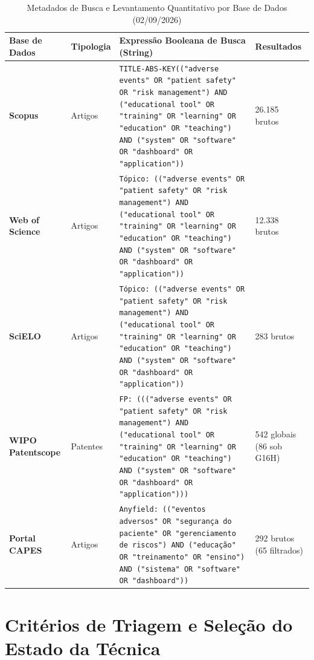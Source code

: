 \begin{table}[!ht]
\centering
\caption[Metadados de Busca e Levantamento Quantitativo por Base de Dados]{Metadados de Busca e Levantamento Quantitativo por Base de Dados (02/09/2026)}
\label{tab_metadados_busca}
\footnotesize
\begin{tabularx}{\textwidth}{p{2.6cm} p{1.8cm} X p{2.2cm}}
\toprule
\textbf{Base de Dados} & \textbf{Tipologia} & \textbf{Expressão Booleana de Busca (String)} & \textbf{Resultados} \\ 
\midrule
\textbf{Scopus} & Artigos & \texttt{TITLE-ABS-KEY(("adverse events" OR "patient safety" OR "risk management") AND ("educational tool" OR "training" OR "learning" OR "education" OR "teaching") AND ("system" OR "software" OR "dashboard" OR "application"))} & 26.185 brutos \\ 
\addlinespace
\textbf{Web of Science} & Artigos & \texttt{Tópico: (("adverse events" OR "patient safety" OR "risk management") AND ("educational tool" OR "training" OR "learning" OR "education" OR "teaching") AND ("system" OR "software" OR "dashboard" OR "application"))} & 12.338 brutos \\ 
\addlinespace
\textbf{SciELO} & Artigos & \texttt{Tópico: (("adverse events" OR "patient safety" OR "risk management") AND ("educational tool" OR "training" OR "learning" OR "education" OR "teaching") AND ("system" OR "software" OR "dashboard" OR "application"))} & 283 brutos \\ 
\addlinespace
\textbf{WIPO Patentscope} & Patentes & \texttt{FP: ((("adverse events" OR "patient safety" OR "risk management") AND ("educational tool" OR "training" OR "learning" OR "education" OR "teaching") AND ("system" OR "software" OR "dashboard" OR "application")))} & 542 globais \newline (86 sob G16H) \\ 
\addlinespace
\textbf{Portal CAPES} & Artigos & \texttt{Anyfield: (("eventos adversos" OR "segurança do paciente" OR "gerenciamento de riscos") AND ("educação" OR "treinamento" OR "ensino") AND ("sistema" OR "software" OR "dashboard"))} & 292 brutos \newline (65 filtrados) \\ 
\bottomrule
\end{tabularx}
\end{table}

\section{Critérios de Triagem e Seleção do Estado da Técnica}
\label{sec_triagem_selecao}

